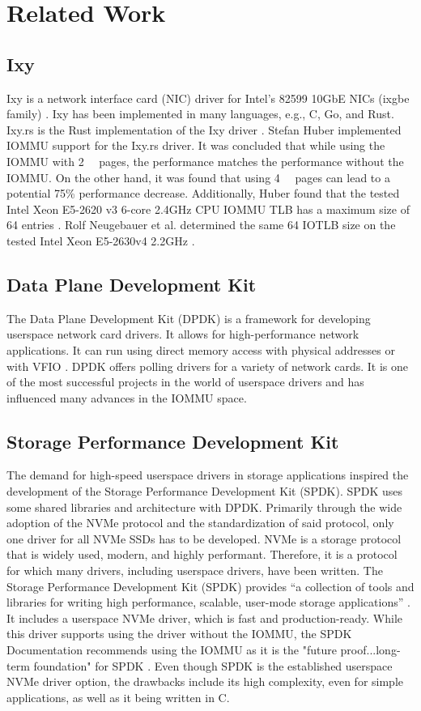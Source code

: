 \chapter{Related Work}

\section{Ixy}
Ixy is a network interface card (NIC) driver for Intel's 82599 10GbE NICs (ixgbe family) \cite{emmerich2019user}.
Ixy has been implemented in many languages, e.g., C, Go, and Rust. Ixy.rs is the Rust implementation of the Ixy driver \cite{baellmann}.
Stefan Huber implemented IOMMU support for the Ixy.rs driver. It was concluded that while using the IOMMU with \qty{2}{\mebi\byte} pages, the performance matches the performance without the IOMMU. On the other hand, it was found that using \qty{4}{\kibi\byte} pages can lead to a potential 75\% performance decrease. Additionally, Huber found that the tested Intel Xeon E5-2620 v3 6-core 2.4GHz CPU IOMMU TLB has a maximum size of 64 entries \cite{iommuhuber}. Rolf Neugebauer et al. determined the same 64 IOTLB size on the tested Intel Xeon E5-2630v4 2.2GHz \cite{pcieperfnegebauer}.

\section{Data Plane Development Kit}
The Data Plane Development Kit (DPDK) is a framework for developing userspace network card drivers. It allows for high-performance network applications. It can run using direct memory access with physical addresses or with VFIO \cite{aboutdpdk}. DPDK offers polling drivers for a variety of network cards.
It is one of the most successful projects in the world of userspace drivers and has influenced many advances in the IOMMU space.

\section{Storage Performance Development Kit}
The demand for high-speed userspace drivers in storage applications inspired the development of the Storage Performance Development Kit (SPDK). SPDK uses some shared libraries and architecture with DPDK. Primarily through the wide adoption of the NVMe protocol and the standardization of said protocol, only one driver for all NVMe SSDs has to be developed.
NVMe is a storage protocol that is widely used, modern, and highly performant. Therefore, it is a protocol for which many drivers, including userspace drivers, have been written. The Storage Performance Development Kit (SPDK) provides ``a collection of tools and libraries for writing high performance, scalable, user-mode storage applications'' \cite{spdkindex}. It includes a userspace NVMe driver, which is fast and production-ready. While this driver supports using the driver without the IOMMU, the SPDK Documentation recommends using the IOMMU as it is the "future proof...long-term foundation" for SPDK \cite{spdkmemory}. Even though SPDK is the established userspace NVMe driver option, the drawbacks include its high complexity, even for simple applications, as well as it being written in C.
